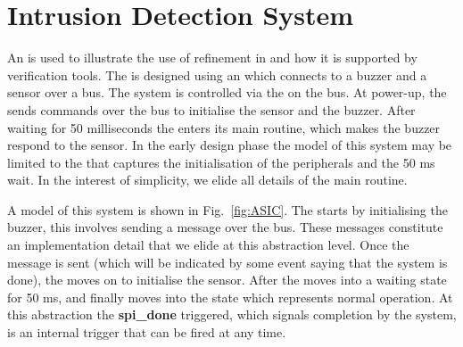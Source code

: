 

\section{Intrusion Detection System}
\label{sec:secbot}

An \IDS is used to illustrate the use of refinement in \statecharts and how it is supported by \EventB verification tools.
The \IDS is designed using an \ASIC which connects to a buzzer and a sensor over a \SPI bus. The system is controlled via the \ASIC on the \SPI bus. At power-up, the \ASIC sends commands over the \SPI bus to initialise the sensor and the buzzer. After waiting for 50 milliseconds the \ASIC enters its main routine, which makes the buzzer respond to the sensor. In the early design phase the \statechart model of this system may be limited to the \ASIC that captures the initialisation of the peripherals and the 50 ms wait. In the interest of simplicity, we elide all details of the main routine.

A \statechart model of this system is shown in Fig.~\ref{fig:ASIC}. The \ASIC starts by initialising the buzzer, this involves sending a message over the \SPI bus. These messages constitute an implementation detail that we elide at this abstraction level. Once the message is sent (which will be indicated by some event saying that the \SPI system is done), the \ASIC moves on to initialise the sensor. After the \ASIC moves into a waiting state for 50 ms, and finally moves into the state which represents normal operation. At this abstraction the \textbf{spi\_done} triggered, which signals completion by the \SPI system, is an internal trigger that can be fired at any time.

